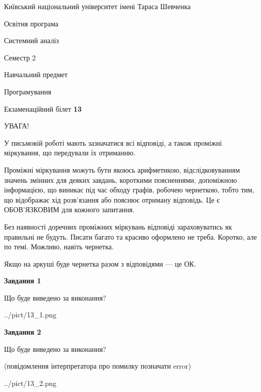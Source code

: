 \documentclass[12pt, ukrainian]{article}
\begin{document}
{{\begin {small}\par
{ \center  Київський національний університет імені Тараса Шевченка \par}
{\parbox {5 cm}{Освітня програма \hfill}{\parbox {7 cm}{Системний аналіз \hfill}}\parbox {6 cm}{\hfill Семестр 2}}\par
{\parbox {5 cm} {Навчальний предмет \hfill}\parbox {7 cm}{Програмування \hfill}\parbox {6cm}{\hfill}\par}\vspace{-7pt} \end{small}}{\center Екзаменаційний білет \No \textbf
{ 13 }\par}}
{
\begin {large}
УВАГА!

У письмовій роботі мають зазначатися всі відповіді, а також проміжні міркування, що передували їх отриманню.

Проміжні міркування можуть бути якоюсь арифметикою, відслідковуванням зна\-чень змінних для деяких завдань,
короткими поясненнями, допоміжною інформацією, що виникає під час обходу графів, робочею чернеткою,
тобто тим, що відображає хід розв’язання або пояснює отриману відповідь.
Це є ОБОВ’ЯЗКОВИМ для кожного запитання.

Без наявності доречних проміжних міркувань відповіді зараховуватись як правиль\-ні не будуть.
Писати багато та красиво оформлено не треба. Коротко, але по темі. Можли\-во, навіть чернетка.

Якщо на аркуші буде чернетка разом з відповідями --- це ОК.

\newpage

{\begin {center}\textbf{Завдання 1}\end {center}}\par
Що буде виведено за виконання?\par
\begin{center}
	{../pict/13_1.png}
\end{center}
\newpage

{\begin {center}\textbf{Завдання 2}\end {center}}\par
Що буде виведено за виконання?\par
 (повідомлення інтерпретатора про помилку позначати error)\par
\begin{center}
	{../pict/13_2.png}
\end{center}
\newpage


\end{large}}
\end{document}
